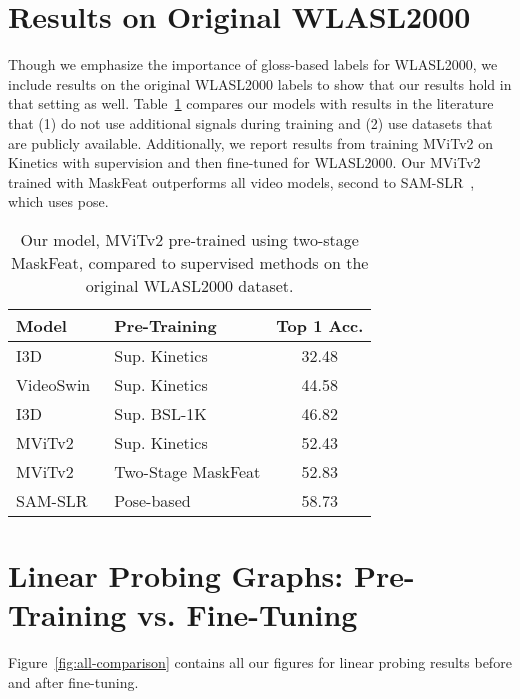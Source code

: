 \section{Results on Original WLASL2000}
\label{sec:appendix-old-wlasl2000}

Though we emphasize the importance of gloss-based labels for WLASL2000, we include results on the original WLASL2000 labels to show that our results hold in that setting as well. Table~\ref{tab:old-wlasl-perf} compares our models with results in the literature that (1) do not use additional signals during training and (2) use datasets that are publicly available. Additionally, we report results from training MViTv2 on Kinetics with supervision and then fine-tuned for WLASL2000. Our MViTv2 trained with MaskFeat outperforms all video models, second to SAM-SLR~\cite{jiang2021skeleton}, which uses pose.

\begin{table}[]
\centering
\begin{tabular}{llc}
\hline
\textbf{Model} & \textbf{Pre-Training} & \textbf{Top 1 Acc.} \\
\hline
I3D & Sup. Kinetics & 32.48 \\
VideoSwin~\cite{Novopoltsev2023Finetuning} & Sup. Kinetics & 44.58 \\
I3D & Sup. BSL-1K & 46.82 \\
MViTv2 & Sup. Kinetics & 52.43 \\
MViTv2 & Two-Stage MaskFeat & 52.83 \\
SAM-SLR & Pose-based & 58.73 \\
\hline
\end{tabular}	
\caption{Our model, MViTv2 pre-trained using two-stage MaskFeat, compared to supervised methods on the original WLASL2000 dataset.}
\label{tab:old-wlasl-perf}
\end{table}

\section{Linear Probing Graphs: Pre-Training vs. Fine-Tuning}
\label{sec:appendix-comparison-graphs}

Figure~\ref{fig:all-comparison} contains all our figures for linear probing results before and after fine-tuning.

